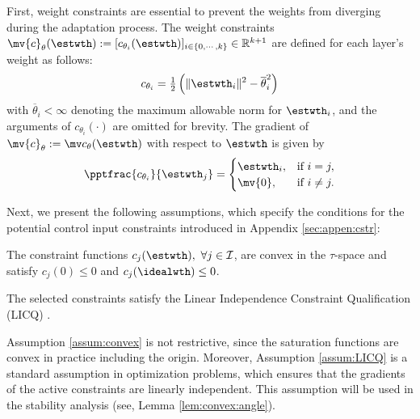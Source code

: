 \documentclass[lettersize,journal]{IEEEtran}
\begin{document}
First, weight constraints are essential to prevent the weights from diverging during the adaptation process.
The weight constraints $\mv{c}_{\theta}(\estwth):= [c_{\theta_i}(\estwth)]_{i\in\{0,\cdots ,k\}}\in\mathbb R^{k+1}$ are defined for each layer's weight as follows:
\begin{equation}
    c_{\theta_i}
    =
    \tfrac{1}{2}
    \left(
        \Vert \estwth_i\Vert^2 
        -
        \overline\theta_i^2 
    \right)    
    \label{eq:cstr:weight:ball}
\end{equation}
with $\overline\theta_i<\infty$ denoting the maximum allowable norm for $\estwth_i$, and the arguments of $c_{\theta_i}(\cdot)$ are omitted for brevity.
The gradient of $\mv{c}_\theta:=\mv c_{\theta}(\estwth)$ with respect to $\estwth$ is given by
\begin{equation}
    \pptfrac{c_{\theta_i}}{\estwth_j} 
    =
    \begin{cases}
        \estwth_i,
        &
        \text{if } i=j,
        \\
        \mv{0},
        &
        \text{if } i\ne j
        .
    \end{cases} 
    \label{eq:cstr:weight:ball:grad}
\end{equation}

Next, we present the following assumptions, which specify the conditions for the potential control input constraints introduced in Appendix \ref{sec:appen:cstr}:

\begin{assum}
    The constraint functions $c_j(\estwth),\ \forall j\in\mathcal I$, are convex in the $\tau$-space and satisfy $c_j(0) \le 0$ and $c_j(\idealwth)\le 0$.
    \label{assum:convex}
\end{assum}

\begin{assum}
    The selected constraints satisfy the Linear Independence Constraint Qualification (LICQ) \cite[Chap.~12 Def.~12.1]{Nocedal:2006aa}.
    \label{assum:LICQ}
\end{assum}

\begin{remark}
    Assumption \ref{assum:convex} is not restrictive, since the saturation functions are convex in practice including the origin.
    Moreover, Assumption \ref{assum:LICQ} is a standard assumption in optimization problems, which ensures that the gradients of the active constraints are linearly independent.
    This assumption will be used in the stability analysis (see, Lemma \ref{lem:convex:angle}).
\end{remark}
\end{document}
